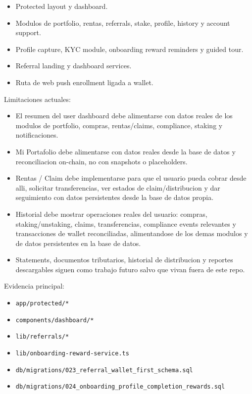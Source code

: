 \documentclass[
  10pt,
  letterpaper,
]{article}
\providecommand{\tightlist}{%
  \setlength{\itemsep}{0pt}\setlength{\parskip}{0pt}}
\let\oldtexttt\texttt
\renewcommand{\texttt}[1]{\oldtexttt{\small #1}}
\begin{document}
\begin{itemize}
\tightlist
\item
  Protected layout y dashboard.
\item
  Modulos de portfolio, rentas, referrals, stake, profile, history y
  account support.
\item
  Profile capture, KYC module, onboarding reward reminders y guided
  tour.
\item
  Referral landing y dashboard services.
\item
  Ruta de web push enrollment ligada a wallet.
\end{itemize}

Limitaciones actuales:

\begin{itemize}
\tightlist
\item
  El resumen del user dashboard debe alimentarse con datos reales de los
  modulos de portfolio, compras, rentas/claims, compliance, staking y
  notificaciones.
\item
  Mi Portafolio debe alimentarse con datos reales desde la base de datos
  y reconciliacion on-chain, no con snapshots o placeholders.
\item
  Rentas / Claim debe implementarse para que el usuario pueda cobrar
  desde alli, solicitar transferencias, ver estados de
  claim/distribucion y dar seguimiento con datos persistentes desde la
  base de datos propia.
\item
  Historial debe mostrar operaciones reales del usuario: compras,
  staking/unstaking, claims, transferencias, compliance events
  relevantes y transacciones de wallet reconciliadas, alimentandose de
  los demas modulos y de datos persistentes en la base de datos.
\item
  Statements, documentos tributarios, historial de distribucion y
  reportes descargables siguen como trabajo futuro salvo que vivan fuera
  de este repo.
\end{itemize}

Evidencia principal:

\begin{itemize}
\tightlist
\item
  \texttt{app/protected/*}
\item
  \texttt{components/dashboard/*}
\item
  \texttt{lib/referrals/*}
\item
  \texttt{lib/onboarding-reward-service.ts}
\item
  \texttt{db/migrations/023\_referral\_wallet\_first\_schema.sql}
\item
  \texttt{db/migrations/024\_onboarding\_profile\_completion\_rewards.sql}
\end{itemize}
\end{document}
